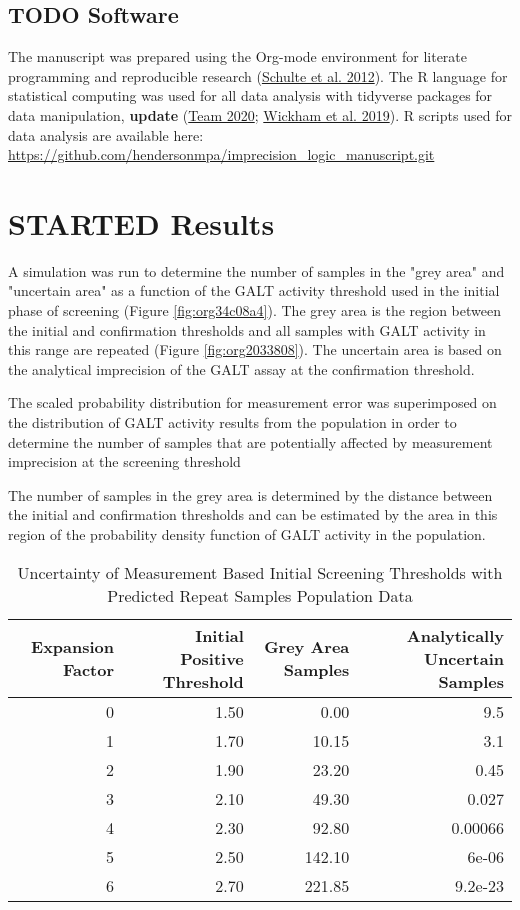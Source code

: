 \documentclass[review]{elsarticle}
\begin{document}
\subsection*{{\bfseries\sffamily TODO} Software}
\label{sec:org726e3e8}
The manuscript was prepared using the Org-mode environment for
literate programming and reproducible research (\hyperlink{citeproc_bib_item_1}{Schulte et al. 2012}). The R language for statistical computing was used
for all data analysis with tidyverse packages for data manipulation,
\textbf{update} (\hyperlink{citeproc_bib_item_2}{Team 2020}; \hyperlink{citeproc_bib_item_3}{Wickham et al. 2019}). R scripts used for data
analysis are available here:
\url{https://github.com/hendersonmpa/imprecision\_logic\_manuscript.git}



\section*{{\bfseries\sffamily STARTED} Results}
\label{sec:org750c59d}

A simulation was run to determine the number of samples in the "grey
area" and "uncertain area" as a function of the GALT activity
threshold used in the initial phase of screening (Figure
\ref{fig:org34c08a4}). The grey area is the region between the initial and
confirmation thresholds and all samples with GALT activity in this
range are repeated (Figure \ref{fig:org2033808}). The uncertain area is based
on the analytical imprecision of the GALT assay at the confirmation
threshold.

The scaled probability distribution for measurement error was
superimposed on the distribution of GALT activity results from the
population in order to determine the number of samples that are
potentially affected by measurement imprecision at the screening
threshold 

The number of samples in the grey area is determined by the distance
between the initial and confirmation thresholds and can be estimated
by the area in this region of the probability density function of GALT
activity in the population.
\begin{table}[ht]
\centering
\begin{tabular}{rrrr}
  \hline
Expansion Factor & Initial Positive Threshold & Grey Area Samples & Analytically Uncertain Samples \\ 
  \hline
  0 & 1.50 & 0.00 & 9.5 \\ 
    1 & 1.70 & 10.15 & 3.1 \\ 
    2 & 1.90 & 23.20 & 0.45 \\ 
    3 & 2.10 & 49.30 & 0.027 \\ 
    4 & 2.30 & 92.80 & 0.00066 \\ 
    5 & 2.50 & 142.10 & 6e-06 \\ 
    6 & 2.70 & 221.85 & 9.2e-23 \\ 
   \hline
\end{tabular}
\caption{Uncertainty of Measurement Based Initial Screening Thresholds with Predicted Repeat Samples Population Data} 
\label{tab:uncertain}
\end{table}
\end{document}
